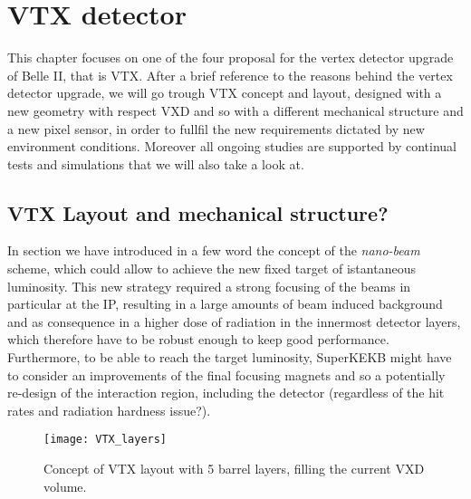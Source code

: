 \chapter{VTX detector}



This chapter focuses on one of the four proposal for the vertex detector upgrade of Belle II, that is VTX. After a brief reference to the reasons behind the vertex detector upgrade, we will go trough VTX concept and layout, designed with a new geometry with respect VXD and so with a different mechanical structure and a new pixel sensor, in order to fullfil the new requirements dictated by new environment conditions. Moreover all ongoing studies are supported by continual tests and simulations that we will also take a look at.


\section{VTX Layout and mechanical structure?}

In section  we have introduced in a few word the concept of the \textit{nano-beam} scheme, which could allow to achieve the new fixed target of istantaneous luminosity. This new strategy required a strong focusing of the beams in particular at the IP, resulting in a large amounts of beam induced background and as consequence in a higher dose of radiation in the innermost detector layers, which therefore have to be robust enough to keep good performance.
Furthermore, to be able to reach the target luminosity, SuperKEKB might have to consider an improvements of the final focusing magnets and so a potentially re-design of the interaction region, including the detector (regardless of the hit rates and radiation hardness issue?).\\

\begin{figure}[h!]
\centering
\texttt{[image: VTX\_layers]}
\caption{Concept of VTX layout with 5 barrel layers, filling the current VXD volume.}
\label{fig:VTX_layers}
\end{figure}


